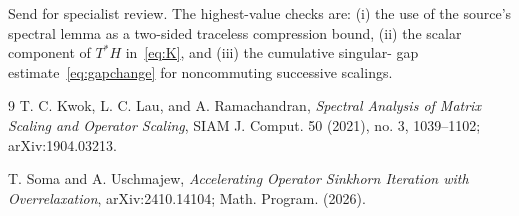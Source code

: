\documentclass[11pt]{article}
\begin{document}
Send for specialist review.  The highest-value checks are: (i) the use of the
source's spectral lemma as a two-sided traceless compression bound, (ii) the
scalar component of $T^*H$ in~\eqref{eq:K}, and (iii) the cumulative singular-
gap estimate~\eqref{eq:gapchange} for noncommuting successive scalings.

\begin{thebibliography}{9}
T. C. Kwok, L. C. Lau, and A. Ramachandran,
\emph{Spectral Analysis of Matrix Scaling and Operator Scaling},
SIAM J. Comput. 50 (2021), no. 3, 1039--1102;
arXiv:1904.03213.

T. Soma and A. Uschmajew,
\emph{Accelerating Operator Sinkhorn Iteration with Overrelaxation},
arXiv:2410.14104; Math. Program. (2026).
\end{thebibliography}
\end{document}
